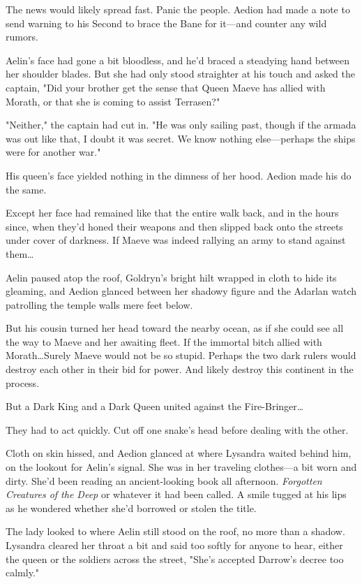 The news would likely spread fast.
Panic the people.
Aedion had made a note to send warning to his Second to brace the Bane for it---and counter any wild rumors.

Aelin's face had gone a bit bloodless, and he'd braced a steadying hand between her shoulder blades.
But she had only stood straighter at his touch and asked the captain, "Did your brother get the sense that Queen Maeve has allied with Morath, or that she is coming to assist Terrasen?"

"Neither," the captain had cut in.
"He was only sailing past, though if the armada was out like that, I doubt it was secret.
We know nothing else---perhaps the ships were for another war."

His queen's face yielded nothing in the dimness of her hood.
Aedion made his do the same.

Except her face had remained like that the entire walk back, and in the hours since, when they'd honed their weapons and then slipped back onto the streets under cover of darkness.
If Maeve was indeed rallying an army to stand against them\ldots{}

Aelin paused atop the roof, Goldryn's bright hilt wrapped in cloth to hide its gleaming, and Aedion glanced between her shadowy figure and the Adarlan watch patrolling the temple walls mere feet below.

But his cousin turned her head toward the nearby ocean, as if she could see all the way to Maeve and her awaiting fleet.
If the immortal bitch allied with Morath\ldots Surely Maeve would not be so stupid.
Perhaps the two dark rulers would destroy each other in their bid for power.
And likely destroy this continent in the process.

But a Dark King and a Dark Queen united against the Fire-Bringer\ldots{}

They had to act quickly.
Cut off one snake's head before dealing with the other.

Cloth on skin hissed, and Aedion glanced at where Lysandra waited behind him, on the lookout for Aelin's signal.
She was in her traveling clothes---a bit worn and dirty.
She'd been reading an ancient-looking book all afternoon.
\emph{Forgotten Creatures of the Deep} or whatever it had been called.
A smile tugged at his lips as he wondered whether she'd borrowed or stolen the title.

The lady looked to where Aelin still stood on the roof, no more than a shadow.
Lysandra cleared her throat a bit and said too softly for anyone to hear, either the queen or the soldiers across the street, "She's accepted Darrow's decree too calmly."

